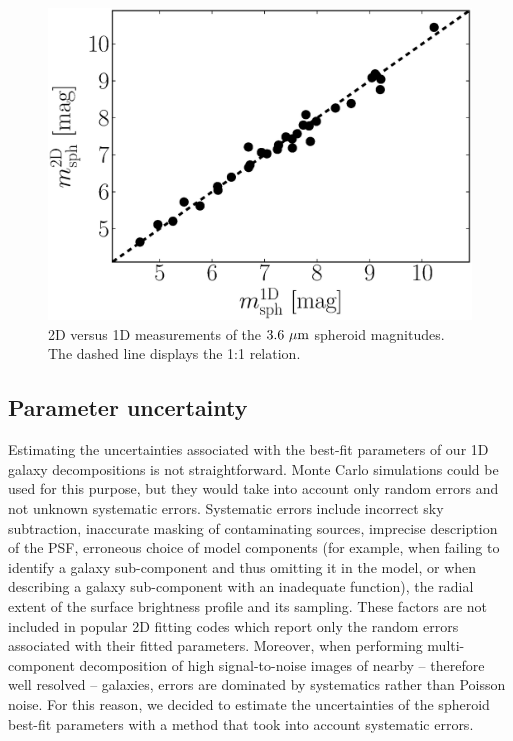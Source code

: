 \documentclass[preprint2]{emulateapj}
\begin{document}
\begin{figure}[h]
\begin{center}
\includegraphics[width=\columnwidth]{comparison_mag.eps} 
\caption{2D versus 1D measurements of the $3.6~\rm \mu m$ spheroid magnitudes. The dashed line displays the 1:1 relation.}
\label{fig:mag1d2d}
\end{center}
\end{figure}



\subsection{Parameter uncertainty}
\label{sec:err}
Estimating the uncertainties associated with the best-fit parameters of our 1D galaxy decompositions is not straightforward.
Monte Carlo simulations could be used for this purpose, 
but they would take into account only random errors and not unknown systematic errors.
Systematic errors include incorrect sky subtraction, 
inaccurate masking of contaminating sources, 
imprecise description of the PSF, 
erroneous choice of model components 
(for example, when failing to identify a galaxy sub-component and thus omitting it in the model, 
or when describing a galaxy sub-component with an inadequate function),
the radial extent of the surface brightness profile and its sampling.
These factors are not included in popular 2D fitting codes which report only the random errors associated with their fitted parameters.  
Moreover, when performing multi-component decomposition of high signal-to-noise images of nearby -- therefore well resolved -- galaxies, 
errors are dominated by systematics rather than Poisson noise.
For this reason, we decided to estimate the uncertainties of the spheroid best-fit parameters 
with a method that took into account systematic errors. 
\end{document}
